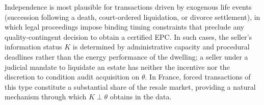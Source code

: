 \noindent Independence is most plausible for transactions driven by exogenous life events (succession following a death, court-ordered liquidation, or divorce settlement), in which legal proceedings impose binding timing constraints that preclude any quality-contingent decision to obtain a certified EPC. In such cases, the seller's information status $K$ is determined by administrative capacity and procedural deadlines rather than the energy performance of the dwelling; a seller under a judicial mandate to liquidate an estate has neither the incentive nor the discretion to condition audit acquisition on $\theta$. In France, forced transactions of this type constitute a substantial share of the resale market, providing a natural mechanism through which $K \perp \theta$ obtains in the data.
